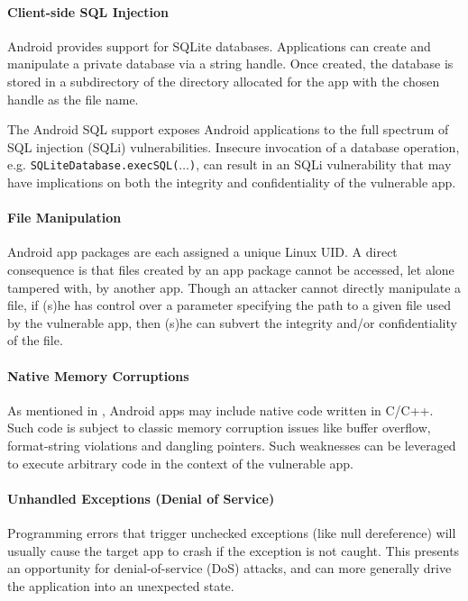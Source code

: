 
\paragraph{Client-side SQL Injection} Android provides support for SQLite databases. Applications can create
and manipulate a private database via a string handle. Once created, the database
is stored in a subdirectory of the directory allocated for the app
with the chosen handle as the file name. 

The Android SQL
support exposes Android applications to the full spectrum of SQL injection (SQLi) vulnerabilities.
Insecure invocation of a database operation, e.g. \texttt{SQLiteDatabase.execSQL($\ldots$)}, can result in an SQLi vulnerability that may have
implications on both the integrity and confidentiality of the vulnerable
app.

\paragraph{File Manipulation} Android
app packages are each assigned a unique Linux UID. A direct consequence
is that files created by an app package cannot be accessed,
let alone tampered with, by another app. Though an attacker cannot directly manipulate a file, if (s)he has control over a parameter specifying the path to a given
 file used by the vulnerable app, then (s)he can subvert
the integrity and/or confidentiality of the file.

\paragraph{Native Memory Corruptions} As mentioned in , Android apps may include
native code written in C/C++. Such code is subject
to classic memory corruption issues like buffer overflow, 
format-string violations and dangling pointers. Such weaknesses can be leveraged to execute arbitrary
code in the context of the vulnerable app.


\paragraph{Unhandled Exceptions (Denial of Service)} Programming errors that trigger unchecked exceptions (like null dereference)
will usually cause the target app to crash if the exception
is not caught. This presents an opportunity for denial-of-service (DoS) attacks, and can more generally drive the application into an unexpected state.